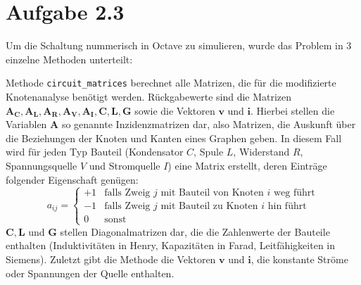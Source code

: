 \section{Aufgabe 2.3}\label{sec:ag2.3}
Um die Schaltung nummerisch in Octave zu simulieren, wurde das Problem in 3 einzelne Methoden unterteilt:

	Methode \texttt{circuit\_matrices} berechnet alle Matrizen, die für die modifizierte Knotenanalyse benötigt werden. Rückgabewerte sind die Matrizen $\mathbf{A_C, A_L, A_R, A_V, A_I, C, L, G}$ sowie die Vektoren $\mathbf{v}$ und $\mathbf{i}$. Hierbei stellen die Variablen $\mathbf{A}$ so genannte Inzidenzmatrizen dar, also Matrizen, die Auskunft über die Beziehungen der Knoten und Kanten eines Graphen geben. In diesem Fall wird für jeden Typ Bauteil (Kondensator $C$, Spule $L$, Widerstand $R$, Spannungsquelle $V$ und Stromquelle $I$) eine Matrix erstellt, deren Einträge folgender Eigenschaft genügen:
	\begin{equation}
	a_{ij} = \begin{cases}
	+1 & \text{falls Zweig }j \text{ mit Bauteil von Knoten }i \text{ weg führt} \\
	-1 & \text{falls Zweig }j \text{ mit Bauteil zu Knoten }i \text{ hin führt} \\
	0  & \text{sonst}
	\end{cases}
	\end{equation}
	$\mathbf{C, L}$ und $\mathbf{G}$ stellen Diagonalmatrizen dar, die die Zahlenwerte der Bauteile enthalten (Induktivitäten in
	Henry, Kapazitäten in Farad, Leitfähigkeiten in Siemens). Zuletzt gibt die Methode die Vektoren $\mathbf{v}$ und $\mathbf{i}$, die konstante Ströme oder Spannungen der Quelle enthalten.
	

